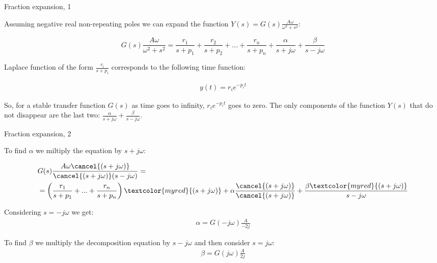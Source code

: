 \documentclass{beamer}
\begin{document}
\begin{frame}{Fraction expansion, 1}
	\begin{flushleft}
		
		Assuming negative real non-repeating poles we can expand the function $Y(s) = G(s)\frac{A \omega}{\omega^2 + s^2}$:
		
		\begin{equation*}
			G(s)\frac{A \omega}{\omega^2 + s^2} = \frac{r_1}{s + p_1} + \frac{r_2}{s + p_2} + ... + \frac{r_n}{s + p_n} + \frac{\alpha}{s + j\omega} + \frac{\beta}{s - j\omega}
		\end{equation*}		
	
		Laplace function of the form $\frac{r_i}{s + p_i}$ corresponds to the following time function:
		
		\begin{align}
			y(t) = r_i e^{-p_i t}
		\end{align} 
	
		So, for a stable transfer function $G(s)$ as time goes to infinity, $r_i e^{-p_i t}$ goes to zero. The only components of the function $Y(s)$ that do not disappear are the last two: $\frac{\alpha}{s + j\omega} + \frac{\beta}{s - j\omega}$.
		
		
	\end{flushleft}
\end{frame}



\begin{frame}{Fraction expansion, 2}
	\begin{flushleft}
		
		To find $\alpha$ we miltiply the equation by $s + j\omega$:
		
		\begin{align*}
			&G(s)\frac{A \omega \cancel{(s + j\omega)}}{ \cancel{(s + j\omega)}(s - j\omega)} 
			= \\
			&=
			\left( \frac{r_1}{s + p_1} + ... + \frac{r_n}{s + p_n} \right) 
			\textcolor{myred}{(s + j\omega) }
			+ 
			\alpha \frac{\cancel{(s + j\omega)}}{ \cancel{(s + j\omega)}}  + \frac{\beta \textcolor{myred}{(s + j\omega) }}{s - j\omega}
		\end{align*}		
		
		Considering $s = -j\omega$ we get:
		\begin{align}
			\alpha = G(-j\omega)\frac{A }{-2j} 
		\end{align}
		
		To find $\beta$ we multiply the decomposition equation by  $s - j\omega$ and then consider $s = j\omega$:
		\begin{align}
			\beta = G(j\omega)\frac{A}{2j} 
		\end{align}
		
	\end{flushleft}
\end{frame}
\end{document}
